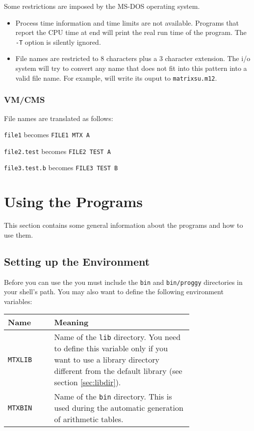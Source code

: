 Some restrictions are imposed by the MS-DOS operating system.
\begin{itemize}
\item Process time information and time limits are not
    available. Programs that report the CPU time at end will
    print the real run time of the program. The \verb"-T"
    option is silently ignored.
\item File names are restricted to 8 characters plus a 3 character
    extension. The {\MeatAxe} i/o system will try to convert any
    name that does not fit into this pattern into a valid file name.
    For example,
    will write its ouput to \verb"matrixsu.m12".
\end{itemize}


\subsubsection*{VM/CMS}
File names are translated as follows:
\begin{list}{}{}
\item	{\tt file1} becomes \mbox{\tt FILE1 MTX A}
\item	{\tt file2.test} becomes \mbox{\tt FILE2 TEST A}
\item	{\tt file3.test.b} becomes \mbox{\tt FILE3 TEST B}
\end{list}




\section{Using the {\MeatAxe} Programs}
This section contains some general information about the {\MeatAxe}
programs and how to use them.


\subsection*{Setting up the Environment}
Before you can use the {\MeatAxe} you must include the {\tt bin}
and {\tt bin/proggy} directories in your shell's path. You may also
want to define the following environment variables:
\begin{center}
\begin{tabular}{|l|p{0.75\linewidth}|}
\hline
Name		& Meaning \\
\hline
\tt MTXLIB	& Name of the {\tt lib} directory. You need to
		  define this variable only if you want to use
		  a library directory different from the default
		  library (see section \ref{sec:libdir}).\\
\hline
\tt MTXBIN	& Name of the {\tt bin} directory. This is used
		  during the automatic generation of arithmetic
		  tables.\\
\hline
\end{tabular}
\end{center}



